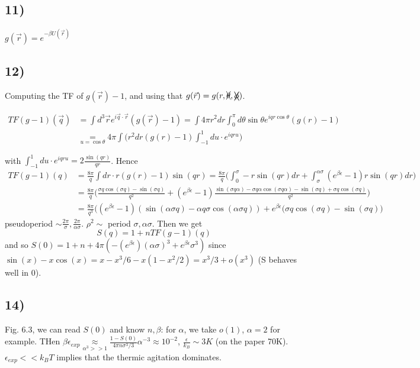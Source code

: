 \documentclass[10pt,a4paper]{book}
\begin{document}
\subsection*{11)}
$g(\vec{r})=e^{-\beta U(\vec{r})}$




\subsection*{12)}


Computing the TF of $g(\vec{r})-1$, and using that  $g(\vec{r})=g(r,\xcancel{\theta},\xcancel{\phi})$.

\begin{align*}
TF(g-1)(\vec{q})&=\int d^3\vec{r} e^{i\vec{q}\cdot\vec{r}}(g(\vec{r})-1)=\int 4\pi r^2dr\int_0^{\pi}d\theta \sin\theta e^{iqr\cos\theta}(g(r)-1)\\
&\underset{u=\cos\theta}{=}4\pi\int\bigg( r^2dr(g(r)-1)\int_{-1}^1 du\cdot e^{iqru}\bigg)
\end{align*}

with $\int_{-1}^1 du\cdot e^{iqru} =2\frac{\sin(qr)}{qr}$.
Hence 
\begin{align*}
TF(g-1)(q)&=\frac{8\pi}{q}\int dr\cdot r(g(r)-1)\sin(qr)=\frac{8\pi}{q}\bigg(\int_{0}^{\sigma} -r\sin(qr)dr+\int_{\sigma}^{\alpha\sigma}(e^{\beta\epsilon}-1)r\sin(qr)dr\bigg)\\
&=\frac{8\pi}{q}\bigg(\frac{\sigma q\cos(\sigma q)-\sin(\sigma q)}{q^2}+(e^{\beta \epsilon}-1)\frac{\sin(\sigma q\alpha)-\sigma q \alpha\cos(\sigma q \alpha)-\sin(\sigma q)+\sigma q\cos(\sigma q)}{q^2}\bigg)\\
&=\frac{8\pi}{q^3}\bigg((e^{\beta\epsilon}-1)(\sin(\alpha\sigma q)-\alpha q\sigma\cos( \alpha\sigma q))+e^{\beta\epsilon}(\sigma q \cos(\sigma q)-\sin(\sigma q)\bigg)
\end{align*}
pseudoperiod $\sim\frac{2\pi}{\sigma},\frac{2\pi}{\alpha\sigma}$. $\rho^2\sim$ period $\sigma,\alpha\sigma$. Then we get 
$$S(q)=1+nTF(g-1)(q)$$ and so $S(0)=1+n+4\pi(-(e^{\beta\epsilon})(\alpha\sigma)^3+e^{\beta\epsilon}\sigma^3)$ since $\sin(x)-x\cos(x)=x-x^3/6-x(1-x^2/2)=x^3/3+o(x^3)$ (S behaves well in 0).

\subsection*{14)}
Fig. 6.3, we can read $S(0)$ and know $n,\beta$: for $\alpha$, we take $o(1)$, $\alpha=2$ for example. THen $\beta\epsilon_{exp}\underset{\alpha^3>>1}{\approx}\frac{1-S(0)}{4\pi n\sigma^3/3}\alpha^{-3}\approx 10^{-2}$, $\frac{\epsilon}{k_B}\sim 3K$ (on the paper 70K). $\epsilon_{exp}<<k_BT$ implies that the thermic agitation dominates.
\end{document}
